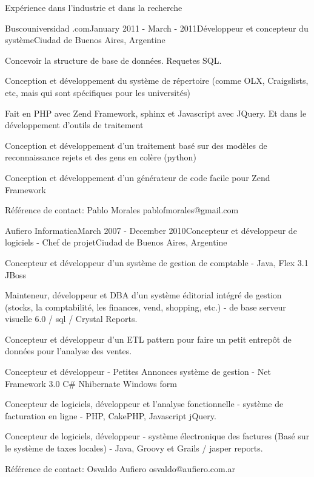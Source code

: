 \documentclass{resume} %
\begin{document}
\begin{rSection}{Exp\'{e}rience dans l'industrie et dans la recherche}
\begin{rSubsection}{Buscouniversidad .com}{January 2011 -  March - 2011}{D\'{e}veloppeur et concepteur du syst\`{e}me}{Ciudad de Buenos Aires, Argentine}
	\item Concevoir la structure de base de donn\'{e}es. Requetes SQL.
	\item Conception et d\'{e}veloppement du syst\`{e}me de r\'{e}pertoire (comme OLX, Craigslists, etc, mais qui sont sp\'{e}cifiques pour les universit\'{e}s)
	\item Fait en PHP avec Zend Framework, sphinx et Javascript avec JQuery. Et dans le d\'{e}veloppement d'outils de traitement
	\item Conception et d\'{e}veloppement d'un traitement bas\'{e} sur des mod\`{e}les de reconnaissance rejets et des gens en col\`{e}re (python)
	\item Conception et d\'{e}veloppement d'un g\'{e}n\'{e}rateur de code facile pour Zend Framework
	\item R\'{e}f\'{e}rence de contact: Pablo Morales pablofmorales@gmail.com
\end{rSubsection}

\begin{rSubsection}{Aufiero Informatica}{March 2007 - December 2010}{Concepteur et d\'{e}veloppeur de logiciels - Chef de projet}{Ciudad de Buenos Aires, Argentine}
	\item Concepteur et d\'{e}veloppeur d'un syst\`{e}me de gestion de comptable - Java, Flex 3.1 JBoss
	\item Mainteneur, d\'{e}veloppeur et DBA d'un syst\`{e}me \'{e}ditorial int\'{e}gr\'{e} de gestion (stocks, la comptabilit\'{e}, les finances, vend, shopping, etc.) - de base serveur visuelle 6.0 / sql / Crystal Reports.
	\item Concepteur et d\'{e}veloppeur d'un ETL pattern pour faire un petit entrepôt de donn\'{e}es pour l'analyse des ventes.
	\item Concepteur et d\'{e}veloppeur - Petites Annonces syst\`{e}me de gestion - Net Framework 3.0 C\# Nhibernate Windows form
	\item Concepteur de logiciels, d\'{e}veloppeur et l'analyse fonctionnelle - syst\`{e}me de facturation en ligne - PHP, CakePHP, Javascript jQuery.
	\item Concepteur de logiciels, d\'{e}veloppeur - syst\`{e}me \'{e}lectronique des factures (Bas\'{e} sur le syst\`{e}me de taxes locales) - Java, Groovy et Grails / jasper reports.
	\item R\'{e}f\'{e}rence de contact: Osvaldo Aufiero osvaldo@aufiero.com.ar
\end{rSubsection}



\end{rSection}
\end{document}
